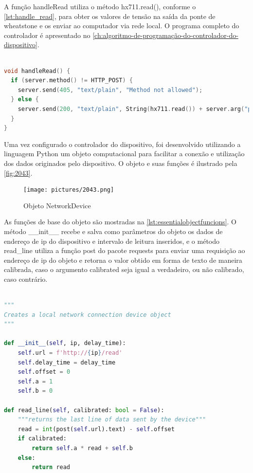 A função handleRead utiliza o método hx711.read(), conforme o \autoref{lst:handle_read}, para obter os valores de tensão na saída da ponte de wheatstone e os
enviar ao computador via rede local.
O programa completo do controlador é apresentado no \autoref{ch:algoritmo-de-programação-do-controlador-do-dispositivo}.

\begin{lstlisting}[label={lst:handle_read},language=C++,caption={[Controller Program]{Função de obtenção de sinal pelo amplificador HX711}}]

void handleRead() {
  if (server.method() != HTTP_POST) {
    server.send(405, "text/plain", "Method not allowed");
  } else {
    server.send(200, "text/plain", String(hx711.read()) + server.arg("plain"));
  }
}

\end{lstlisting}

Uma vez configurado o controlador do dispositivo, foi desenvolvido utilizando a linguagem Python um objeto computacional para facilitar a conexão e utilização dos dados
originados pelo dispositivo.
O objeto e suas funções é ilustrado pela \autoref{fig:2043}.

\begin{figure}[htb]
	\caption{\label{fig:2043} Objeto NetworkDevice}
	\begin{center}
		\texttt{[image: pictures/2043.png]}
	\end{center}
\end{figure}

As funções de base do objeto são mostradas na \autoref{lst:essentialobjectfuncions}.
O método \_\_init\_\_ recebe e salva como parâmetros do objeto os dados de endereço de ip do dispositivo e intervalo de leitura inseridos,
e o método read\_line utiliza a função post do pacote requests para enviar uma requisição ao endereço de ip do objeto e retorna o valor obtido em forma de
texto de maneira calibrada, caso o argumento calibrated seja igual a verdadeiro, ou não calibrado, caso contrário.

\begin{lstlisting}[label={lst:essentialobjectfuncions},language=Python,caption={[NetworkDevice]{Métodos base do objeto NetworkDevice}}]

"""
Creates a local network connection device object
"""

def __init__(self, ip, delay_time):
	self.url = f'http://{ip}/read'
	self.delay_time = delay_time
	self.offset = 0
	self.a = 1
	self.b = 0

def read_line(self, calibrated: bool = False):
	"""returns the last line of data sent by the device"""
	read = int(post(self.url).text) - self.offset
	if calibrated:
		return self.a * read + self.b
	else:
		return read

\end{lstlisting}


